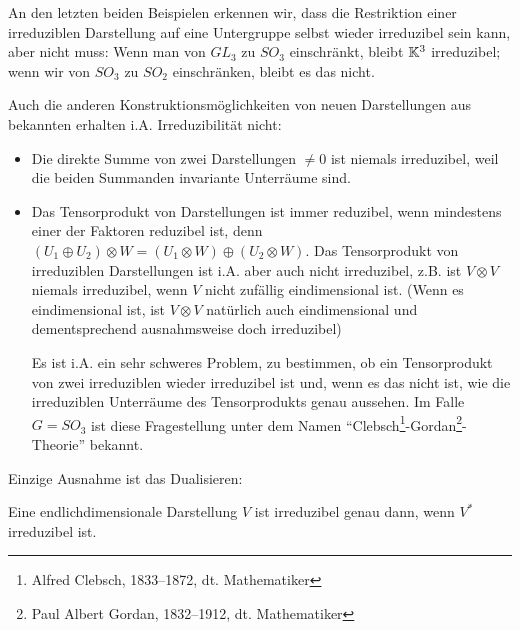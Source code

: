 \begin{remark}
An den letzten beiden Beispielen erkennen wir, dass die Restriktion einer irreduziblen Darstellung auf eine Untergruppe selbst wieder irreduzibel sein kann, aber nicht muss: Wenn man von $GL_3$ zu $SO_3$ einschränkt, bleibt $\mathbb{K}^3$ irreduzibel; wenn wir von $SO_3$ zu $SO_2$ einschränken, bleibt es das nicht.

Auch die anderen Konstruktionsmöglichkeiten von neuen Darstellungen aus bekannten erhalten i.A. Irreduzibilität nicht:
\begin{itemize}
\item Die direkte Summe von zwei Darstellungen $\neq 0$ ist niemals irreduzibel, weil die beiden Summanden invariante Unterräume sind.
\item Das Tensorprodukt von Darstellungen ist immer reduzibel, wenn mindestens einer der Faktoren reduzibel ist, denn $(U_1\oplus U_2)\otimes W = (U_1\otimes W) \oplus (U_2\otimes W)$. Das Tensorprodukt von irreduziblen Darstellungen ist i.A. aber auch nicht irreduzibel, z.B. ist $V\otimes V$ niemals irreduzibel, wenn $V$ nicht zufällig eindimensional ist. (Wenn es eindimensional ist, ist $V\otimes V$ natürlich auch eindimensional und dementsprechend ausnahmsweise doch irreduzibel)

Es ist i.A. ein sehr schweres Problem, zu bestimmen, ob ein Tensorprodukt von zwei irreduziblen wieder irreduzibel ist und, wenn es das nicht ist, wie die irreduziblen Unterräume des Tensorprodukts genau aussehen. Im Falle $G=SO_3$ ist diese Fragestellung unter dem Namen \enquote{Clebsch\footnote{Alfred Clebsch, 1833--1872, dt. Mathematiker}-Gordan\footnote{Paul Albert Gordan, 1832--1912, dt. Mathematiker}-Theorie} bekannt.
\end{itemize}

Einzige Ausnahme ist das Dualisieren:
\end{remark}

\begin{lemma}
Eine endlichdimensionale Darstellung $V$ ist irreduzibel genau dann, wenn $V^\ast$ irreduzibel ist.
\end{lemma}